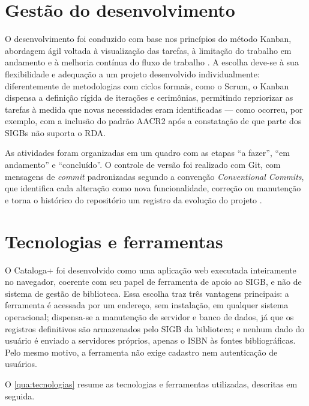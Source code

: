 \section{Gestão do desenvolvimento}
\label{sec:kanban}

O desenvolvimento foi conduzido com base nos princípios do método Kanban, abordagem ágil voltada à visualização das tarefas, à limitação do trabalho em andamento e à melhoria contínua do fluxo de trabalho \cite{anderson2010}. A escolha deve-se à sua flexibilidade e adequação a um projeto desenvolvido individualmente: diferentemente de metodologias com ciclos formais, como o Scrum, o Kanban dispensa a definição rígida de iterações e cerimônias, permitindo repriorizar as tarefas à medida que novas necessidades eram identificadas --- como ocorreu, por exemplo, com a inclusão do padrão AACR2 após a constatação de que parte dos SIGBs não suporta o RDA.

As atividades foram organizadas em um quadro com as etapas ``a fazer'', ``em andamento'' e ``concluído''. O controle de versão foi realizado com Git, com mensagens de \textit{commit} padronizadas segundo a convenção \textit{Conventional Commits}, que identifica cada alteração como nova funcionalidade, correção ou manutenção e torna o histórico do repositório um registro da evolução do projeto \cite{chacon2014}.

\section{Tecnologias e ferramentas}
\label{sec:tecnologias}

O Cataloga+ foi desenvolvido como uma aplicação web executada inteiramente no navegador, coerente com seu papel de ferramenta de apoio ao SIGB, e não de sistema de gestão de biblioteca. Essa escolha traz três vantagens principais: a ferramenta é acessada por um endereço, sem instalação, em qualquer sistema operacional; dispensa-se a manutenção de servidor e banco de dados, já que os registros definitivos são armazenados pelo SIGB da biblioteca; e nenhum dado do usuário é enviado a servidores próprios, apenas o ISBN às fontes bibliográficas. Pelo mesmo motivo, a ferramenta não exige cadastro nem autenticação de usuários.

O \autoref{qua:tecnologias} resume as tecnologias e ferramentas utilizadas, descritas em seguida.

